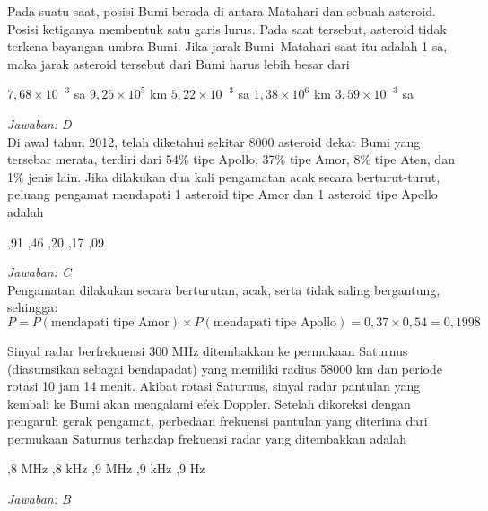 \documentclass[11pt,fleqn]{exam}
\begin{document}
\begin{questions}
\question Pada suatu saat, posisi Bumi berada di antara Matahari dan sebuah asteroid. Posisi ketiganya membentuk satu garis lurus. Pada saat tersebut, asteroid tidak terkena bayangan umbra Bumi. Jika jarak Bumi\---Matahari saat itu adalah 1 sa, maka jarak asteroid tersebut dari Bumi harus lebih besar dari
\begin{choices}
\choice $7,68\times 10^{-3}$ sa
\choice $9,25\times 10^5$ km
\choice $5,22\times 10^{-3}$ sa
\choice $1,38\times 10^6$ km
\choice $3,59\times 10^{-3}$ sa
\end{choices}

\textit{Jawaban: D}\\





\question Di awal tahun 2012, telah diketahui sekitar 8000 asteroid dekat Bumi yang tersebar merata, terdiri dari 54\% tipe Apollo, 37\% tipe Amor, 8\% tipe Aten, dan 1\% jenis lain. Jika dilakukan dua kali pengamatan acak secara berturut-turut, peluang pengamat mendapati 1 asteroid tipe Amor dan 1 asteroid tipe Apollo
adalah
\begin{choices}
,91
,46
,20
,17
,09
\end{choices}

\textit{Jawaban: C}\\

Pengamatan dilakukan secara berturutan, acak, serta tidak saling bergantung, sehingga:
\begin{equation*}
P = P(\text{mendapati tipe Amor}) \times P(\text{mendapati tipe Apollo}) = 0,37 \times 0,54 = 0,1998
\end{equation*}


\question Sinyal radar berfrekuensi 300 MHz ditembakkan ke permukaan Saturnus (diasumsikan sebagai bendapadat) yang memiliki radius 58000 km dan periode rotasi 10 jam 14 menit. Akibat rotasi Saturnus, sinyal
radar pantulan yang kembali ke Bumi akan mengalami efek Doppler. Setelah dikoreksi dengan pengaruh
gerak pengamat, perbedaan frekuensi pantulan yang diterima dari permukaan Saturnus terhadap frekuensi
radar yang ditembakkan adalah
\begin{choices}
,8 MHz
,8 kHz
,9 MHz
,9 kHz
,9 Hz
\end{choices}

\textit{Jawaban: B}\\



\end{questions}
\end{document}
